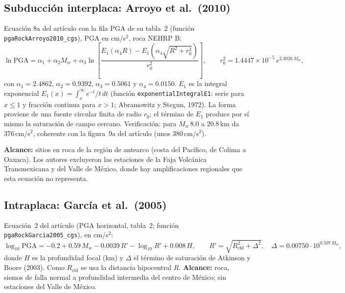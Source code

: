 \documentclass[11pt,a4paper]{article}
\begin{document}
\subsection{Subducción interplaca: Arroyo et al.\ (2010)}
Ecuación 8a del artículo con la fila PGA de su tabla~2 (función \texttt{pgaRockArroyo2010\_cgs}),
PGA en cm/s$^2$, roca NEHRP B:
\begin{equation}
  \ln \mathrm{PGA} = \alpha_1 + \alpha_2 M_w + \alpha_3 \ln\!\left[\frac{E_1(\alpha_4 R) - E_1\!\left(\alpha_4\sqrt{R^2 + r_0^2}\right)}{r_0^2}\right],
  \qquad r_0^2 = 1.4447\times10^{-5}\,e^{2.3026\,M_w},
\end{equation}
con $\alpha_1 = 2.4862$, $\alpha_2 = 0.9392$, $\alpha_3 = 0.5061$ y $\alpha_4 = 0.0150$. $E_1$ es la
integral exponencial $E_1(x) = \int_x^\infty e^{-t}/t\,dt$ (función \texttt{exponentialIntegralE1}: serie
para $x \le 1$ y fracción continua para $x > 1$; Abramowitz y Stegun, 1972). La forma proviene de una
fuente circular finita de radio $r_0$: el término de $E_1$ produce por sí mismo la saturación de campo
cercano. Verificación: para $M_w$\,8.0 a 20.8\,km da 376\,cm/s$^2$, coherente con la figura~9a del
artículo (unos 380\,cm/s$^2$).

\textbf{Alcance:} sitios en roca de la región de antearco (costa del Pacífico, de Colima a Oaxaca). Los
autores excluyeron las estaciones de la Faja Volcánica Transmexicana y del Valle de México, donde hay
amplificaciones regionales que esta ecuación no representa.

\subsection{Intraplaca: García et al.\ (2005)}
Ecuación~2 del artículo (PGA horizontal, tabla~2; función \texttt{pgaRockGarcia2005\_cgs}), en cm/s$^2$:
\begin{equation}
  \log_{10}\mathrm{PGA} = -0.2 + 0.59\,M_w - 0.0039\,R' - \log_{10} R' + 0.008\,H,
  \qquad R' = \sqrt{R_{\mathrm{cld}}^2 + \Delta^2},\quad \Delta = 0.00750\cdot 10^{0.507\,M_w},
\end{equation}
donde $H$ es la profundidad focal (km) y $\Delta$ el término de saturación de Atkinson y Boore (2003).
Como $R_{\mathrm{cld}}$ se usa la distancia hipocentral $R$. \textbf{Alcance:} roca, sismos de falla
normal a profundidad intermedia del centro de México; sin estaciones del Valle de México.
\end{document}
